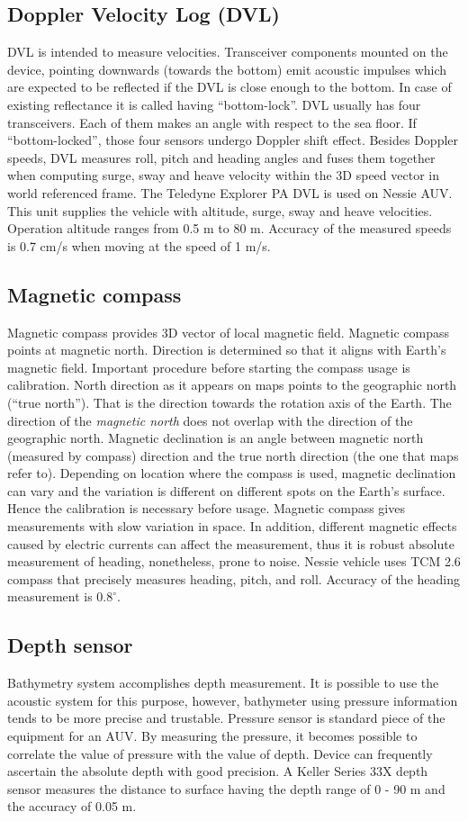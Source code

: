 \subsection{Doppler Velocity Log (DVL)}
DVL is intended to measure  velocities. Transceiver components mounted on the device, pointing downwards (towards the bottom) emit acoustic impulses which are expected to be reflected if the DVL is close enough to the bottom. In case of existing reflectance it is called having ``bottom-lock''. DVL usually has four transceivers. Each of them makes an angle with respect to the sea floor. If ``bottom-locked'', those four sensors undergo Doppler shift effect. Besides Doppler speeds, DVL measures roll, pitch and heading angles and fuses them together when computing surge, sway and heave velocity within the 3D speed vector in world referenced frame. The Teledyne Explorer PA DVL is used on Nessie AUV. This unit supplies the vehicle with altitude, surge, sway and heave velocities. Operation altitude ranges from 0.5 m to 80 m. Accuracy of the measured speeds is 0.7 cm/s when moving at the speed of 1 m/s.

\subsection{Magnetic compass} 
Magnetic compass provides 3D vector of local magnetic field. Magnetic compass points at magnetic north. Direction is determined so that it aligns with Earth's magnetic field. Important procedure before starting the compass usage is calibration. North direction as it appears on maps points to the geographic north (``true north''). That is the direction towards the rotation axis of the Earth. The direction of the \textit{magnetic north} does not overlap with the direction of the geographic north. Magnetic declination is an angle between magnetic north (measured by compass) direction and the true north direction (the one that maps refer to). Depending on location where the compass is used, magnetic declination can vary and the variation is different on different spots on the Earth's surface. Hence the calibration is necessary before usage. Magnetic compass gives measurements with slow variation in space. In addition, different magnetic effects caused by electric currents can affect the measurement, thus it is robust absolute measurement of heading, nonetheless, prone to noise. Nessie vehicle uses TCM 2.6 compass that precisely measures heading, pitch, and roll. Accuracy of the heading measurement is $0.8^{\circ}$.
\subsection{Depth sensor} 
Bathymetry system accomplishes depth measurement. It is possible to use the acoustic system for this purpose, however, bathymeter using pressure information tends to be more precise and trustable. Pressure sensor is standard piece of the equipment for an AUV. By measuring the pressure, it becomes possible to correlate the value of pressure with the value of depth. Device can frequently ascertain the absolute depth with good precision. A Keller Series 33X depth sensor measures the distance to surface having the depth range of 0 - 90 m and the accuracy of 0.05 m. 
